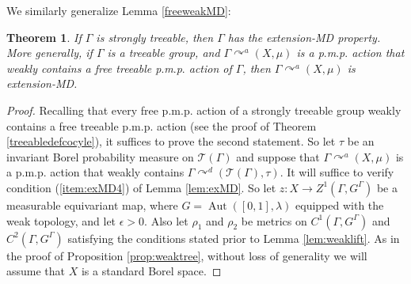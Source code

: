 \documentclass[12pt]{amsart}
\newtheorem{thm}{Theorem}[section]
\theoremstyle{definition}
\def\cal{\mathcal}
\DeclareMathOperator{\Aut}{Aut}
\newcommand{\pmp}{p{$.$}m{$.$}p{$.$}}
\newcommand{\acts}{\curvearrowright}
\begin{document}
We similarly generalize Lemma \ref{freeweakMD}:

\begin{thm}\label{stronglytreeableweakMD}
	If $\Gamma$ is strongly treeable, then $\Gamma$ has the extension-MD property.  More generally, if $\Gamma$ is a treeable group, and $\Gamma \acts^a (X, \mu)$ is a {\pmp} action that weakly contains a free treeable {\pmp} action of $\Gamma$, then $\Gamma \acts^a (X, \mu)$ is extension-MD.
\end{thm}

\begin{proof}
	Recalling that every free {\pmp} action of a strongly treeable group weakly contains a free treeable {\pmp} action (see the proof of Theorem \ref{treeabledefcocyle}), it suffices to prove the second statement. So let $\tau$ be an invariant Borel probability measure on $\cal T(\Gamma)$ and suppose that $\Gamma \acts^a (X, \mu)$ is a {\pmp} action that weakly contains $\Gamma \acts^d (\cal T(\Gamma), \tau)$. It will suffice to verify condition (\ref{item:exMD4}) of Lemma \ref{lem:exMD}. So let $z : X \rightarrow Z^1(\Gamma, G^\Gamma)$ be a measurable equivariant map, where $G = \Aut([0,1], \lambda)$ equipped with the weak topology, and let $\epsilon > 0$. Also let $\rho_1$ and $\rho_2$ be metrics on $C^1(\Gamma, G^\Gamma)$ and $C^2(\Gamma, G^\Gamma)$ satisfying the conditions stated prior to Lemma \ref{lem:weaklift}. As in the proof of Proposition \ref{prop:weaktree}, without loss of generality we will assume that $X$ is a standard Borel space.
	

\end{proof}
\end{document}
